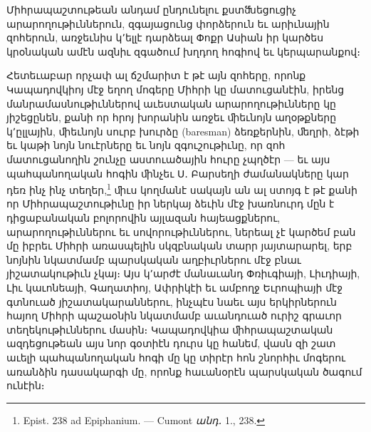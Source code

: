 \documentclass{article}
\begin{document}
{Միհրապաշտութեան անդամ ընդունելու քստﬓեցուցիչ արարողութիւններուն, զգայացունց փորձերուն եւ արիւնային զոհերուն, առջեւնիս կ՚ելլէ դարձեալ Փոքր Ասիան իր կարծես կրօնական ամէն ազնիւ զգածում խղդող հոգիով եւ կերպարանքով։

Հետեւաբար որչափ ալ ճշմարիտ է թէ այն զոհերը, որոնք Կապադովկիոյ մէջ եղող մոգերը Միհրի կը մատուցանէին, իրենց մանրամասնութիւններով աւեստական արարողութիւնները կը յիշեցընեն, քանի որ հրոյ խորանին առջեւ ﬕեւնոյն աղօթքները կ՚ըլլային, ﬕեւնոյն սուրբ խուրձը (baresman) ձեռքերնին, ﬔղրի, ձէթի եւ կաթի նոյն նուէրները եւ նոյն զգուշութիւնը, որ զոհ մատուցանողին շունչը աստուածային հուրը չպղծէր — եւ այս պահպանողական հոգին ﬕնչեւ Ս․ Բարսեղի ժամանակները կար դեռ ինչ ինչ տեղեր,\footnote{Epist. 238 ad Epiphanium. — Cumont \emph{անդ․} 1., 238.} ﬕւս կողմանէ սակայն ան ալ ստոյգ է թէ քանի որ Միհրապաշտութիւնը իր ներկայ ձեւին մէջ խառնուրդ մըն է դիցաբանական բոլորովին այլազան հայեացքներու, արարողութիւններու եւ սովորութիւններու, ներեալ չէ կարծեմ բան մը իբրեւ Միհրի առասպելին սկզբնական տարր յայտարարել, երբ նոյնին նկատմամբ պարսկական աղբիւրներու մէջ բնաւ յիշատակութիւն չկայ։ Այս կ՚արժէ մանաւանդ Փռիւգիայի, Լիւդիայի, Լիւ կաւոնեայի, Գաղատիոյ, Ափրիկէի եւ ամբողջ Եւրոպիայի մէջ գտնուած յիշատակարաններու, ինչպէս նաեւ այս երկիրներուն հայող Միհրի պաշաօնին նկատմամբ աւանդուած ուրիշ գրաւոր տեղեկութիւններու մասին։ Կապադովկիա ﬕհրապաշտական ազդեցութեան այս նոր գօտիէն դուրս կը հանեմ, վասն զի շատ աւելի պահպանողական հոգի մը կը տիրէր հոն շնորհիւ մոգերու առանձին դասակարգի մը, որոնք հաւանօրէն պարսկական ծագում ունէին։

}
\end{document}
